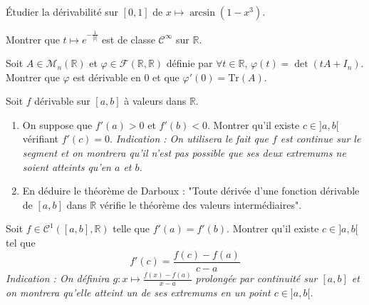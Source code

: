 \begin{exercice}
Étudier la dérivabilité sur $[0, 1]$ de $x\mapsto \arcsin(1-x^{3})$.
\end{exercice}

\begin{exercice}
Montrer que $t\mapsto e^{-\frac{1}{|t|}}$ est de classe $\mathcal{C}^{\infty}$ sur $\mathbb{R}$.
\end{exercice}

\begin{exercice}
Soit $A\in \mathcal{M}_{n}(\mathbb{R})$ et $\varphi\in \mathcal{F}(\mathbb{R},\mathbb{R})$ définie par $\forall t\in\mathbb{R}$, $\varphi(t)=\det(tA+I_{n})$.
Montrer que $\varphi$ est dérivable en 0 et que $\varphi'(0)=\text{Tr}(A)$.
\end{exercice}

\begin{exercice}
Soit $f$ dérivable sur $[a, b]$ à valeurs dans $\mathbb{R}$.
\begin{enumerate}
    \item On suppose que $f'(a)>0$ et $f'(b)<0$.
    Montrer qu'il existe $c\in]a,b[$ vérifiant $f'(c)=0$.
    \textit{Indication : On utilisera le fait que $f$ est continue sur le segment et on montrera qu'il n'est pas possible que ses deux extremums ne soient atteints qu'en $a$ et $b$.}
    \item En déduire le théorème de Darboux : "Toute dérivée d'une fonction dérivable de $[a, b]$ dans $\mathbb{R}$ vérifie le théorème des valeurs intermédiaires".
\end{enumerate}
\end{exercice}

\begin{exercice}
Soit $f\in \mathcal{C}^{1}([a,b],\mathbb{R})$ telle que $f'(a)=f'(b)$.
Montrer qu'il existe $c\in]a,b[$ tel que
$$ f'(c)=\frac{f(c)-f(a)}{c-a} $$
\textit{Indication : On définira $g:x\mapsto\frac{f(x)-f(a)}{x-a}$ prolongée par continuité sur $[a, b]$ et on montrera qu'elle atteint un de ses extremums en un point $c\in]a,b[$.}
\end{exercice}


